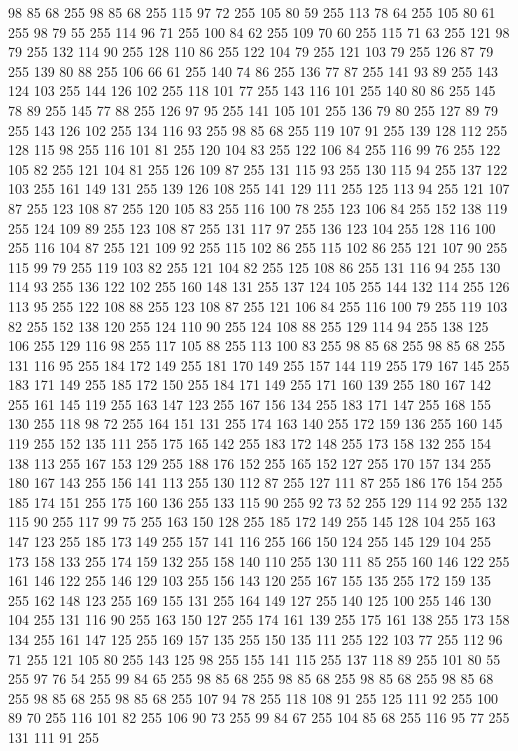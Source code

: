 98 85 68 255 98 85 68 255 115 97 72 255 105 80 59 255 113 78 64 255 105 80 61 255 98 79 55 255 114 96 71 255 100 84 62 255 109 70 60 255 115 71 63 255 121 98 79 255 132 114 90 255 128 110 86 255 122 104 79 255 121 103 79 255 126 87 79 255 139 80 88 255 106 66 61 255 140 74 86 255 136 77 87 255 141 93 89 255 143 124 103 255 144 126 102 255 118 101 77 255 143 116 101 255 140 80 86 255 145 78 89 255 145 77 88 255 126 97 95 255 141 105 101 255 136 79 80 255 127 89 79 255 143 126 102 255 134 116 93 255 98 85 68 255 119 107 91 255 139 128 112 255 128 115 98 255 116 101 81 255 120 104 83 255 122 106 84 255 116 99 76 255 122 105 82 255 121 104 81 255 126 109 87 255 131 115 93 255 130 115 94 255 137 122 103 255 161 149 131 255 139 126 108 255 141 129 111 255 125 113 94 255 121 107 87 255 123 108 87 255 120 105 83 255 116 100 78 255 123 106 84 255 152 138 119 255 124 109 89 255 123 108 87 255 131 117 97 255 136 123 104 255 128 116 100 255
116 104 87 255 121 109 92 255 115 102 86 255 115 102 86 255 121 107 90 255 115 99 79 255 119 103 82 255 121 104 82 255 125 108 86 255 131 116 94 255 130 114 93 255 136 122 102 255 160 148 131 255 137 124 105 255 144 132 114 255 126 113 95 255 122 108 88 255 123 108 87 255 121 106 84 255 116 100 79 255 119 103 82 255 152 138 120 255 124 110 90 255 124 108 88 255 129 114 94 255 138 125 106 255 129 116 98 255 117 105 88 255 113 100 83 255 98 85 68 255 98 85 68 255 131 116 95 255 184 172 149 255 181 170 149 255 157 144 119 255 179 167 145 255 183 171 149 255 185 172 150 255 184 171 149 255 171 160 139 255 180 167 142 255 161 145 119 255 163 147 123 255 167 156 134 255 183 171 147 255 168 155 130 255 118 98 72 255 164 151 131 255 174 163 140 255 172 159 136 255 160 145 119 255 152 135 111 255 175 165 142 255 183 172 148 255 173 158 132 255 154 138 113 255 167 153 129 255 188 176 152 255 165 152 127 255 170 157 134 255 180 167 143 255 156 141 113 255 130 112 87 255 127 111 87 255
186 176 154 255 185 174 151 255 175 160 136 255 133 115 90 255 92 73 52 255 129 114 92 255 132 115 90 255 117 99 75 255 163 150 128 255 185 172 149 255 145 128 104 255 163 147 123 255 185 173 149 255 157 141 116 255 166 150 124 255 145 129 104 255 173 158 133 255 174 159 132 255 158 140 110 255 130 111 85 255 160 146 122 255 161 146 122 255 146 129 103 255 156 143 120 255 167 155 135 255 172 159 135 255 162 148 123 255 169 155 131 255 164 149 127 255 140 125 100 255 146 130 104 255 131 116 90 255 163 150 127 255 174 161 139 255 175 161 138 255 173 158 134 255 161 147 125 255 169 157 135 255 150 135 111 255 122 103 77 255 112 96 71 255 121 105 80 255 143 125 98 255 155 141 115 255 137 118 89 255 101 80 55 255 97 76 54 255 99 84 65 255 98 85 68 255 98 85 68 255 98 85 68 255 98 85 68 255 98 85 68 255 98 85 68 255 107 94 78 255 118 108 91 255 125 111 92 255 100 89 70 255 116 101 82 255 106 90 73 255 99 84 67 255 104 85 68 255 116 95 77 255 131 111 91 255
